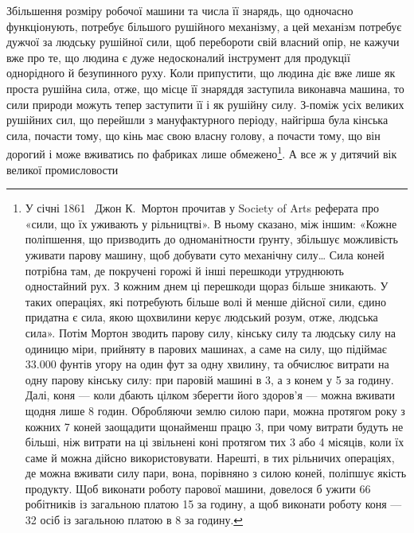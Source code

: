 Збільшення розміру робочої машини та числа її знарядь,
що одночасно функціонують, потребує більшого рушійного механізму,
а цей механізм потребує дужчої за людську рушійної сили,
щоб перебороти свій власний опір, не кажучи вже про те, що
людина є дуже недосконалий інструмент для продукції однорідного
й безупинного руху. Коли припустити, що людина діє
вже лише як проста рушійна сила, отже, що місце її знаряддя
заступила виконавча машина, то сили природи можуть тепер
заступити її і як рушійну силу. З-поміж усіх великих рушійних
сил, що перейшли з мануфактурного періоду, найгірша була
кінська сила, почасти тому, що кінь має свою власну голову,
а почасти тому, що він дорогий і може вживатись по фабриках
лише обмежено\footnote{
У січні 1861~ Джон К.~Мортон прочитав у Society of Arts реферата
про «сили, що їх уживають у рільництві». В ньому сказано, між
іншим: «Кожне поліпшення, що призводить до одноманітности ґрунту,
збільшує можливість уживати парову машину, щоб добувати суто механічну
силу\dots{} Сила коней потрібна там, де покручені горожі й інші перешкоди
утруднюють одностайний рух. З кожним днем ці перешкоди щораз
більше зникають. У таких операціях, які потребують більше волі й менше
дійсної сили, єдино придатна є сила, якою щохвилини керує людський
розум, отже, людська сила». Потім Мортон зводить парову силу, кінську
силу та людську силу на одиницю міри, прийняту в парових машинах,
а саме на силу, що підіймає \num{33.000} фунтів угору на один фут за одну хвилину,
та обчислює витрати на одну парову кінську силу: при паровій
машині в 3, а з конем у 5 за годину. Далі, коня — коли
дбають цілком зберегти його здоров’я — можна вживати щодня лише
8 годин. Обробляючи землю силою пари, можна протягом року з кожних
7 коней заощадити щонайменш працю 3, при чому витрати будуть не
більші, ніж витрати на ці звільнені коні протягом тих 3 або 4 місяців,
коли їх саме й можна дійсно використовувати. Нарешті, в тих рільничих
операціях, де можна вживати силу пари, вона, порівняно з силою коней,
поліпшує якість продукту. Щоб виконати роботу парової машини, довелося
б ужити 66 робітників із загальною платою 15 за годину,
а щоб виконати роботу коня — 32 осіб із загальною платою в 8
за годину.
}. А все ж у дитячий вік великої промисловости
\parbreak{}  %
